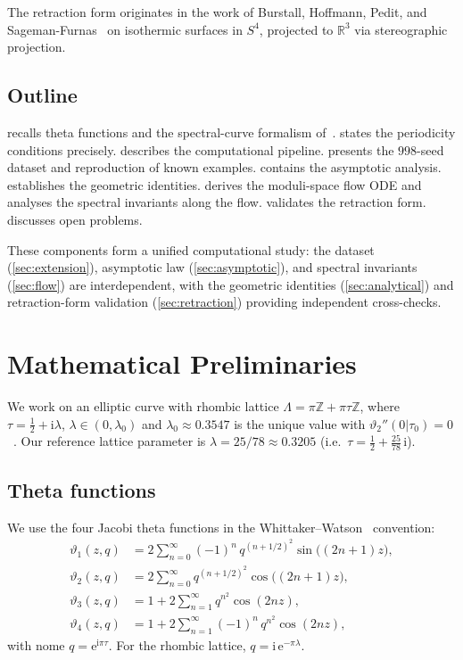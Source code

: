 \documentclass[11pt,a4paper]{article}
\theoremstyle{plain}
\theoremstyle{definition}
\theoremstyle{remark}
\newcommand{\vt}[1]{\vartheta_{#1}}     %
\newcommand{\RR}{\mathbb{R}}
\newcommand{\ZZ}{\mathbb{Z}}
\newcommand{\ee}{\mathrm{e}}
\newcommand{\ii}{\mathrm{i}}
\begin{document}
The retraction form originates in the work of Burstall, Hoffmann,
Pedit, and Sageman-Furnas~\cite{BCHR25} on isothermic
surfaces in $S^4$, projected to $\RR^3$ via stereographic projection.

\subsection{Outline}
 recalls theta functions and the spectral-curve
formalism of~\cite{BHS-comp}.   states the
periodicity conditions precisely.   describes
the computational pipeline.   presents the
$998$-seed dataset and reproduction of known examples.
 contains the asymptotic analysis.
 establishes the geometric identities.
 derives the moduli-space flow ODE and analyses
the spectral invariants along the flow.
 validates the retraction form.
 discusses open problems.

These components form a unified computational study: the dataset
(\cref{sec:extension}), asymptotic law (\cref{sec:asymptotic}), and
spectral invariants (\cref{sec:flow}) are interdependent, with the
geometric identities (\cref{sec:analytical}) and retraction-form
validation (\cref{sec:retraction}) providing independent
cross-checks.

\section{Mathematical Preliminaries}\label{sec:prelim}

We work on an elliptic curve with rhombic lattice
$\Lambda = \pi\ZZ + \pi\tau\ZZ$, where
$\tau = \tfrac12 + \ii\lambda$, $\lambda \in (0,\lambda_0)$ and
$\lambda_0 \approx 0.3547$ is the unique value with
$\vt{2}''(0|\tau_0) = 0$~\cite[Lemma~8]{BHS-comp}.
Our reference lattice parameter is $\lambda = 25/78 \approx 0.3205$
(i.e.\ $\tau = \tfrac{1}{2} + \tfrac{25}{78}\,\ii$).

\subsection{Theta functions}\label{sec:theta}
We use the four Jacobi theta functions in the
Whittaker--Watson~\cite{WW27} convention:
\begin{align}
  \vt{1}(z,q) &= 2\sum_{n=0}^{\infty} (-1)^n\, q^{(n+1/2)^2}
    \sin\bigl((2n+1)z\bigr), \label{eq:theta1} \\
  \vt{2}(z,q) &= 2\sum_{n=0}^{\infty} q^{(n+1/2)^2}
    \cos\bigl((2n+1)z\bigr), \label{eq:theta2} \\
  \vt{3}(z,q) &= 1 + 2\sum_{n=1}^{\infty} q^{n^2}
    \cos(2nz), \label{eq:theta3} \\
  \vt{4}(z,q) &= 1 + 2\sum_{n=1}^{\infty} (-1)^n\, q^{n^2}
    \cos(2nz), \label{eq:theta4}
\end{align}
with nome $q = \ee^{\ii\pi\tau}$.  For the rhombic lattice,
$q = \ii\,\ee^{-\pi\lambda}$.
\end{document}
